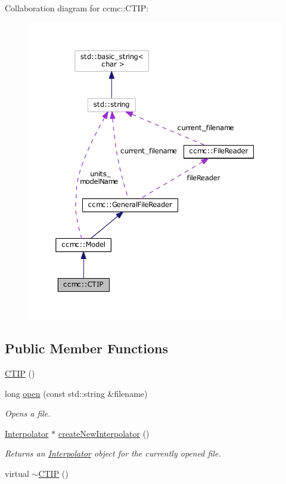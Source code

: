 Collaboration diagram for ccmc\-:\-:C\-T\-I\-P\-:
\nopagebreak
\begin{figure}[H]
\begin{center}
\leavevmode
\includegraphics[width=350pt]{classccmc_1_1_c_t_i_p__coll__graph}
\end{center}
\end{figure}
\subsection*{Public Member Functions}
\begin{DoxyCompactItemize}
\item 
\hyperlink{classccmc_1_1_c_t_i_p_ad443922ade80ec2a2c170976299006c6}{C\-T\-I\-P} ()
\item 
long \hyperlink{classccmc_1_1_c_t_i_p_a2771b8d2ef4f22425f3e460ed5a9e671}{open} (const std\-::string \&filename)
\begin{DoxyCompactList}\small\item\em Opens a file. \end{DoxyCompactList}\item 
\hyperlink{classccmc_1_1_interpolator}{Interpolator} $\ast$ \hyperlink{classccmc_1_1_c_t_i_p_a1efb34250bf5ef2eebac5ef68fe446f9}{create\-New\-Interpolator} ()
\begin{DoxyCompactList}\small\item\em Returns an \hyperlink{classccmc_1_1_interpolator}{Interpolator} object for the currently opened file. \end{DoxyCompactList}\item 
virtual \hyperlink{classccmc_1_1_c_t_i_p_a74bd2c42b1dbe07e8ce1d2fcca5ada35}{$\sim$\-C\-T\-I\-P} ()
\end{DoxyCompactItemize}

